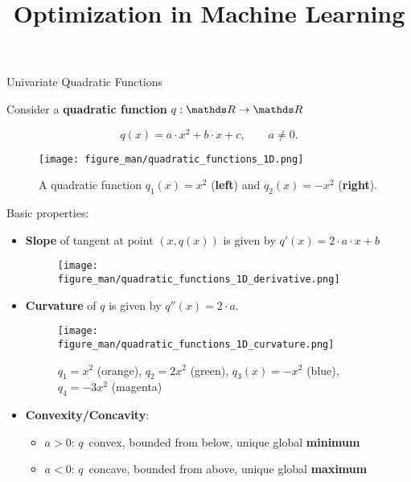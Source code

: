 \documentclass[11pt,compress,t,notes=noshow, xcolor=table]{beamer}
\title{Optimization in Machine Learning}
\date{}
\begin{document}
\lecture{\inserttitle}
\sloppy

\begin{vbframe}{Univariate Quadratic Functions}

Consider a \textbf{quadratic function} $q: \R \to \R$

$$
q(x) = a \cdot x^2 + b \cdot x + c, \qquad a \ne 0.
$$


\begin{figure}
    \texttt{[image: figure\_man/quadratic\_functions\_1D.png]} \\
    \caption*{A quadratic function $q_1(x) = x^2$ (\textbf{left}) and $q_2(x) = - x^2$ (\textbf{right}).}
\end{figure}

\framebreak 

Basic properties: 

\begin{itemize}
    \item \textbf{Slope} of tangent at point $(x, q(x))$ is given by $q'(x) = 2 \cdot a \cdot x + b$
        \begin{figure}
            \texttt{[image: figure\_man/quadratic\_functions\_1D\_derivative.png]} \\
        \end{figure}
    \item \textbf{Curvature} of $q$ is given by $q''(x) = 2\cdot a$. 
        \begin{figure}
            \texttt{[image: figure\_man/quadratic\_functions\_1D\_curvature.png]} \\
            \caption*{\footnotesize $q_1 = x^2$ (orange), $q_2 = 2 x^2$ (green), $q_3 (x) = - x^2$ (blue), $q_4 = - 3 x^2$ (magenta)}
        \end{figure}

    \framebreak
    
    \item \textbf{Convexity/Concavity}:
        \begin{itemize}
            \setlength{\itemindent}{-0.5cm}
            \item $a > 0$: $q$~convex, bounded from below, unique global \textbf{minimum}
            \item $a < 0$: $q$~concave, bounded from above, unique global \textbf{maximum}
        \end{itemize}
    

\end{itemize}
\end{vbframe}
\end{document}
